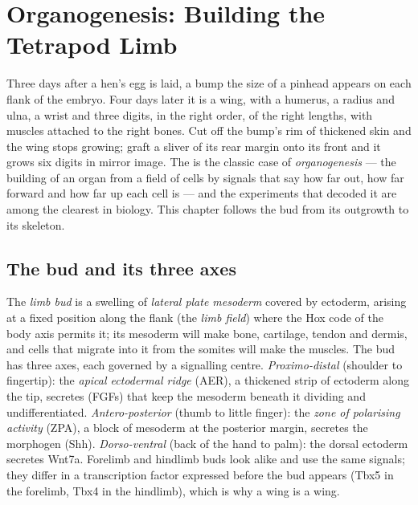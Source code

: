 \chapter{Organogenesis: Building the Tetrapod Limb}\label{ch:b2:limb-organogenesis}

Three days after a hen's egg is laid, a bump the size of a pinhead
appears on each flank of the embryo. Four days later it is a wing,
with a humerus, a radius and ulna, a wrist and three digits, in the
right order, of the right lengths, with muscles attached to the
right bones. Cut off the bump's rim of thickened skin and the wing
stops growing; graft a sliver of its rear margin onto its front and
it grows six digits in mirror image. The  is the classic
case of \emph{organogenesis} --- the building of an organ from a
field of cells by signals that say how far out, how far forward and
how far up each cell is --- and the experiments that decoded it are
among the clearest in biology. This chapter follows the bud from
its outgrowth to its skeleton.

\section{The bud and its three axes}

\begin{definition}\label{def:b2:limb-organogenesis:bud}
The \emph{limb bud} is a swelling of \emph{lateral plate mesoderm}
covered by ectoderm, arising at a fixed position along the flank
(the \emph{limb field}) where the Hox code of the body axis permits
it; its mesoderm will make bone, cartilage, tendon and dermis, and
cells that migrate into it from the somites will make the muscles.
The bud has three axes, each governed by a signalling centre.
\emph{Proximo-distal} (shoulder to fingertip): the \emph{apical
ectodermal ridge} (AER), a thickened strip of ectoderm along the
tip, secretes  (FGFs) that keep the
mesoderm beneath it dividing and undifferentiated.
\emph{Antero-posterior} (thumb to little finger): the \emph{zone of
polarising activity} (ZPA), a block of mesoderm at the posterior
margin, secretes the morphogen \emph{} (Shh).
\emph{Dorso-ventral} (back of the hand to palm): the dorsal
ectoderm secretes Wnt7a. Forelimb and hindlimb buds look alike and
use the same signals; they differ in a transcription factor
expressed before the bud appears (Tbx5 in the forelimb, Tbx4 in the
hindlimb), which is why a wing is a wing.
\end{definition}

